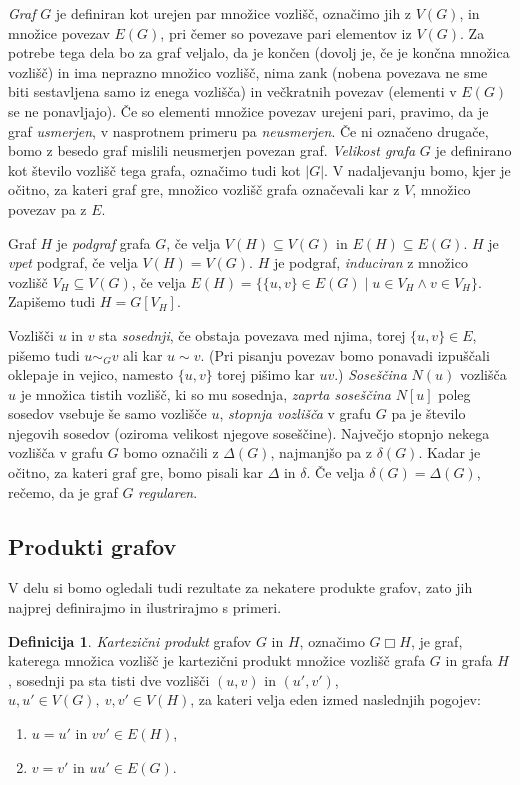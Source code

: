 \documentclass[12pt,a4paper,twoside]{article}
\theoremstyle{definition} %
\newtheorem{definicija}{Definicija}[section]
\theoremstyle{plain} %
\numberwithin{equation}{section}  %
\DeclareMathOperator{\boxempty}{\Box}
\begin{document}
\emph{Graf} $G$ je definiran kot urejen par množice vozlišč, označimo jih z $V(G)$, in množice povezav $E(G)$, pri čemer so povezave pari elementov iz $V(G)$. Za potrebe tega dela bo za graf veljalo, da je končen (dovolj je, če je končna množica vozlišč) in ima neprazno množico vozlišč, nima zank (nobena povezava ne sme biti sestavljena samo iz enega vozlišča) in večkratnih povezav (elementi v $E(G)$ se ne ponavljajo). Če so elementi množice povezav urejeni pari, pravimo, da je graf \emph{usmerjen}, v nasprotnem primeru pa \emph{neusmerjen}. Če ni označeno drugače, bomo z besedo graf mislili neusmerjen povezan graf. \emph{Velikost grafa} $G$ je definirano kot število vozlišč tega grafa, označimo tudi kot $|G|$. V nadaljevanju bomo, kjer je očitno, za kateri graf gre, množico vozlišč grafa označevali kar z $V$, množico povezav pa z $E$. 

Graf $H$ je \emph{podgraf} grafa $G$, če velja $V(H) \subseteq V(G)$ in $E(H) \subseteq E(G)$. $H$ je \emph{vpet} podgraf, če velja $V(H) = V(G)$. $H$ je podgraf, \emph{induciran} z množico vozlišč $V_H \subseteq V(G)$, če velja $E(H) = \{ \{ u,v \} \in E(G) \mid u \in V_H \land v \in V_H \}$. Zapišemo tudi $H = G[V_H]$.

Vozlišči $u$ in $v$ sta \emph{sosednji}, če obstaja povezava med njima, torej $\{u,v\} \in E$, pišemo tudi $u \sim_G v$ ali kar $u \sim v$. (Pri pisanju povezav bomo ponavadi izpuščali oklepaje in vejico, namesto $\{u,v\}$ torej pišimo kar $uv$.) \emph{Soseščina} $N(u)$ vozlišča $u$ je množica tistih vozlišč, ki so mu sosednja, \emph{zaprta soseščina} $N[u]$ poleg sosedov vsebuje še samo vozlišče $u$, \emph{stopnja vozlišča} v grafu $G$ pa je število njegovih sosedov (oziroma velikost njegove soseščine). Največjo stopnjo nekega vozlišča v grafu $G$ bomo označili z $\Delta(G)$, najmanjšo pa z $\delta(G)$. Kadar je očitno, za kateri graf gre, bomo pisali kar $\Delta$ in $\delta$. Če velja $\delta(G) = \Delta(G)$, rečemo, da je graf $G$ \emph{regularen}.

\subsection{Produkti grafov}
V delu si bomo ogledali tudi rezultate za nekatere produkte grafov, zato jih najprej definirajmo in ilustrirajmo s primeri.

\begin{definicija}
    \emph{Kartezični produkt} grafov $G$ in $H$, označimo $G \boxempty H$, je graf, katerega  množica vozlišč je kartezični produkt množice vozlišč grafa $G$ in grafa $H$, sosednji pa sta tisti dve vozlišči $(u, v)$ in $(u', v')$, $u, u' \in V(G),\ v, v' \in V(H)$, za kateri velja eden izmed naslednjih pogojev:
    \begin{enumerate}
        \item $u = u'$ in $vv' \in E(H)$,
        \item $v = v'$ in $uu' \in E(G)$.
    \end{enumerate}
\end{definicija}
\end{document}
